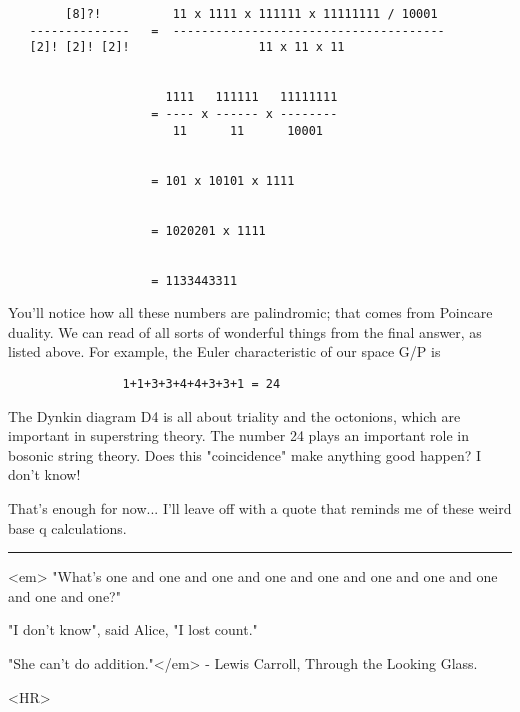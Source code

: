 \begin{verbatim}
        [8]?!          11 x 1111 x 111111 x 11111111 / 10001
   --------------   =  --------------------------------------
   [2]! [2]! [2]!                  11 x 11 x 11


                      1111   111111   11111111
                    = ---- x ------ x --------
                       11      11      10001


                    = 101 x 10101 x 1111


                    = 1020201 x 1111
 

                    = 1133443311
\end{verbatim}
    
You'll notice how all these numbers are palindromic; that comes from
Poincare duality.  We can read of all sorts of wonderful things from
the final answer, as listed above.  For example, the Euler characteristic 
of our space G/P is

\begin{verbatim}
                1+1+3+3+4+4+3+3+1 = 24
\end{verbatim}
    
The Dynkin diagram D4 is all about triality and the octonions, which are
important in superstring theory.  The number 24 plays an important role
in bosonic string theory.  Does this "coincidence" make
anything good happen?  I don't know!

That's enough for now... I'll leave off with a quote that reminds
me of these weird base q calculations.

\par\noindent\rule{\textwidth}{0.4pt}
<em>
"What's one and one and one and one and one and one and one and one
and one and one?"  

"I don't know", said Alice, "I lost count."  

"She can't do addition."</em> - Lewis Carroll, Through the Looking Glass.


<HR>



